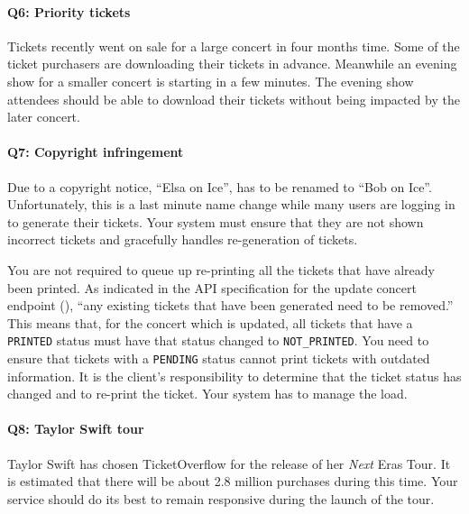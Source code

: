 \documentclass{csse4400}
\begin{document}
\paragraph{Q6: Priority tickets}
Tickets recently went on sale for a large concert in four months time.
Some of the ticket purchasers are downloading their tickets in advance.
Meanwhile an evening show for a smaller concert is starting in a few minutes.
The evening show attendees should be able to download their tickets without being impacted by the later concert.

\paragraph{Q7: Copyright infringement}
Due to a copyright notice, ``Elsa on Ice'', has to be renamed to ``Bob on Ice''.
Unfortunately, this is a last minute name change while many users are logging in to generate their tickets.
Your system must ensure that they are not shown incorrect tickets and gracefully handles re-generation of tickets.

You are not required to queue up re-printing all the tickets that have already been printed.
As indicated in the API specification for the update concert endpoint
(),
``any existing tickets that have been generated need to be removed.''
This means that, for the concert which is updated, all tickets that have a \texttt{PRINTED}
status must have that status changed to \texttt{NOT\_PRINTED}.
You need to ensure that tickets with a \texttt{PENDING} status cannot print tickets with outdated information.
It is the client's responsibility to determine that the ticket status has changed and to re-print the ticket.
Your system has to manage the load.

\paragraph{Q8: Taylor Swift tour}
Taylor Swift has chosen TicketOverflow for the release of her \textit{Next} Eras Tour.
It is estimated that there will be about 2.8 million purchases during this time.
Your service should do its best to remain responsive during the launch of the tour.
\end{document}
